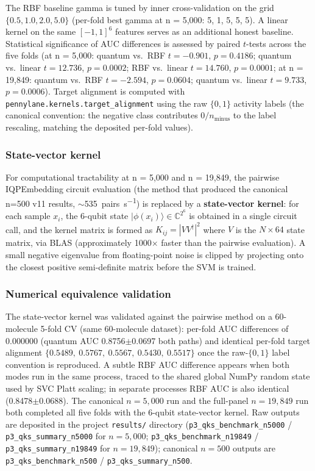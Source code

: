 \documentclass[11pt,a4paper]{article}
\begin{document}
The RBF baseline gamma is tuned by inner cross-validation on the grid $\{0.5, 1.0, 2.0, 5.0\}$ (per-fold best gamma at n = 5,000: 5, 1, 5, 5, 5). A linear kernel on the same $[-1,1]^6$ features serves as an additional honest baseline. Statistical significance of AUC differences is assessed by paired $t$-tests across the five folds (at n = 5,000: quantum vs.\ RBF $t=-0.901$, $p=0.4186$; quantum vs.\ linear $t=12.736$, $p=0.0002$; RBF vs.\ linear $t=14.760$, $p=0.0001$; at n = 19,849: quantum vs.\ RBF $t=-2.594$, $p=0.0604$; quantum vs.\ linear $t=9.733$, $p=0.0006$). Target alignment is computed with \texttt{pennylane.kernels.target\_alignment} using the raw $\{0,1\}$ activity labels (the canonical convention: the negative class contributes $0/n_{\text{minus}}$ to the label rescaling, matching the deposited per-fold values).

\subsubsection{State-vector kernel}
For computational tractability at n = 5,000 and n = 19,849, the pairwise IQPEmbedding circuit evaluation (the method that produced the canonical n=500 v11 results, $\sim$\SI{535}{pairs\per\second}) is replaced by a \textbf{state-vector kernel}: for each sample $x_i$, the 6-qubit state $|\phi(x_i)\rangle \in \mathbb{C}^{2^6}$ is obtained in a single circuit call, and the kernel matrix is formed as $K_{ij} = |V V^\dagger|^2$ where $V$ is the $N \times 64$ state matrix, via BLAS (approximately \num{1000}$\times$ faster than the pairwise evaluation). A small negative eigenvalue from floating-point noise is clipped by projecting onto the closest positive semi-definite matrix before the SVM is trained.

\subsubsection{Numerical equivalence validation}
The state-vector kernel was validated against the pairwise method on a 60-molecule 5-fold CV (same 60-molecule dataset): per-fold AUC differences of $0.000000$ (quantum AUC \num{0.8756}$\pm$0.0697 both paths) and identical per-fold target alignment $\{0.5489,\ 0.5767,\ 0.5567,\ 0.5430,\ 0.5517\}$ once the raw-$\{0,1\}$ label convention is reproduced. A subtle RBF AUC difference appears when both modes run in the same process, traced to the shared global NumPy random state used by SVC Platt scaling; in separate processes RBF AUC is also identical (0.8478$\pm$0.0688). The canonical $n=5{,}000$ run and the full-panel $n=19{,}849$ run both completed all five folds with the 6-qubit state-vector kernel. Raw outputs are deposited in the project \texttt{results/} directory (\texttt{p3\_qks\_benchmark\_n5000} / \texttt{p3\_qks\_summary\_n5000} for $n=5{,}000$; \texttt{p3\_qks\_benchmark\_n19849} / \texttt{p3\_qks\_summary\_n19849} for $n=19{,}849$); canonical $n=500$ outputs are \texttt{p3\_qks\_benchmark\_n500} / \texttt{p3\_qks\_summary\_n500}.
\end{document}
